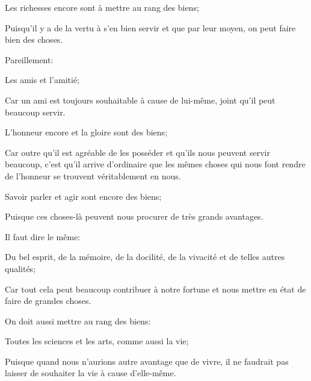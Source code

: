 \bigbreak

\begin{lieu}
	Les richesses encore sont à mettre au rang des biens;
\end{lieu}

Puisqu'il y a de la vertu à s'en bien servir et que par leur moyen, on peut faire bien des choses.

\bigbreak

Pareillement:

\begin{lieu}
	Les amis et l'amitié;
\end{lieu}

Car un ami est toujours souhaitable à cause de lui-même, joint qu'il peut beaucoup servir.

\bigbreak

\begin{lieu}
	L'honneur encore et la gloire sont des biens;
\end{lieu}

Car outre qu'il est agréable de les posséder et qu'ils nous peuvent servir beaucoup, c'est qu'il arrive d'ordinaire que les mêmes choses
qui nous font rendre de l'honneur se trouvent véritablement en nous.

\bigbreak

\begin{lieu}
	Savoir parler et agir sont encore des biens;
\end{lieu}

Puisque ces choses-là peuvent nous procurer de très grands avantages. 

\bigbreak

Il faut dire le même:

\begin{lieu}
	Du bel esprit, de la mémoire, de la docilité, de la vivacité et de telles autres qualités;
\end{lieu}

Car tout cela peut beaucoup contribuer à notre fortune et nous mettre en état de faire de grandes choses. 

\bigbreak

On doit aussi mettre au rang des biens:

\begin{lieu}
	Toutes les sciences et les arts, comme aussi la vie;
\end{lieu}

Puisque quand nous n'aurions autre avantage que de vivre, il ne faudrait pas laisser de souhaiter la vie à cause d'elle-même.

